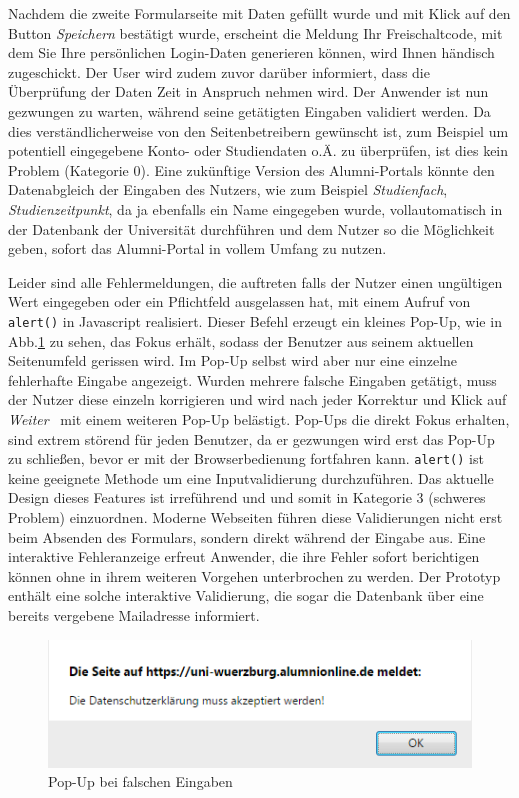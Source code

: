 { Nachdem die zweite Formularseite mit Daten gefüllt wurde und mit Klick auf den Button \emph{Speichern} bestätigt wurde, erscheint die Meldung \glqq Ihr Freischaltcode, mit dem Sie Ihre persönlichen Login-Daten generieren können, wird Ihnen händisch zugeschickt\grqq. Der User wird zudem zuvor darüber informiert, dass die Überprüfung der Daten Zeit in Anspruch nehmen wird.
}
{ Der Anwender ist nun gezwungen zu warten, während seine getätigten Eingaben validiert werden. Da dies verständlicherweise von den Seitenbetreibern gewünscht ist, zum Beispiel um potentiell eingegebene Konto- oder Studiendaten o.Ä. zu überprüfen, ist dies kein Problem (Kategorie 0). 
}
{ Eine zukünftige Version des Alumni-Portals könnte den Datenabgleich der Eingaben des Nutzers, wie zum Beispiel \emph{Studienfach}, \emph{Studienzeitpunkt}, da ja ebenfalls ein Name eingegeben wurde, vollautomatisch in der Datenbank der Universität durchführen und dem Nutzer so die Möglichkeit geben, sofort das Alumni-Portal in vollem Umfang zu nutzen.
}
\label{prob:reg:wartezeit}

{ Leider sind alle Fehlermeldungen, die auftreten falls der Nutzer einen ungültigen Wert eingegeben oder ein Pflichtfeld ausgelassen hat, mit einem Aufruf von \texttt{alert()} in Javascript realisiert. Dieser Befehl erzeugt ein kleines Pop-Up, wie in Abb.\ref{fig:regpopup} zu sehen, das Fokus erhält, sodass der Benutzer aus seinem aktuellen Seitenumfeld gerissen wird. Im Pop-Up selbst wird aber nur eine einzelne fehlerhafte Eingabe angezeigt. Wurden mehrere falsche Eingaben getätigt, muss der Nutzer diese einzeln korrigieren und wird nach jeder Korrektur und Klick auf \emph{Weiter} ~mit einem weiteren Pop-Up belästigt.
}
{ Pop-Ups die direkt Fokus erhalten, sind extrem störend für jeden Benutzer, da er gezwungen wird erst das Pop-Up zu schließen, bevor er mit der Browserbedienung fortfahren kann. \texttt{alert()} ist keine geeignete Methode um eine Inputvalidierung durchzuführen. Das aktuelle Design dieses Features ist irreführend und und somit in Kategorie 3 (schweres Problem) einzuordnen.
}
{ Moderne Webseiten führen diese Validierungen nicht erst beim Absenden des Formulars, sondern direkt während der Eingabe aus. Eine interaktive Fehleranzeige erfreut Anwender, die ihre Fehler sofort berichtigen können ohne in ihrem weiteren Vorgehen unterbrochen zu werden. Der Prototyp enthält eine solche interaktive Validierung, die sogar die Datenbank über eine bereits vergebene Mailadresse informiert.}
\begin{figure}
	\centering
		\includegraphics{figures/regpopup.png}
	\caption{Pop-Up bei falschen Eingaben}
	\label{fig:regpopup}
\end{figure}

